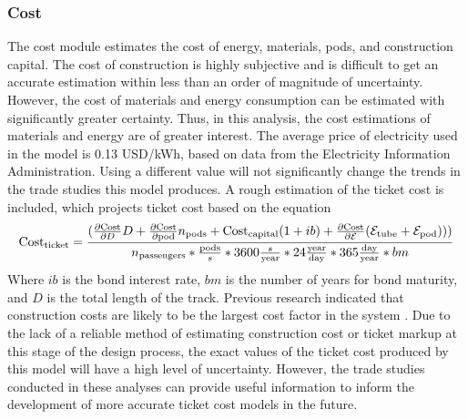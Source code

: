 \subsubsection{Cost}
	The cost module estimates the cost of energy, materials, pods, and
	construction capital. The cost of construction is highly subjective and is
	difficult to get an accurate estimation within less than an order of
	magnitude of uncertainty. However, the cost of materials and energy
	consumption can be estimated with significantly greater certainty.
	Thus, in this analysis, the cost estimations of materials and energy are of greater interest.
	The average price of electricity used in the model is 0.13 USD/kWh, based on
	data from the Electricity Information Administration\cite{EIA}.
	Using a different value will not significantly change the trends in the trade studies this model produces.
	A rough estimation of the ticket cost is included, which projects ticket cost based on the equation
	\begin{equation}
		\label{eq:ticket_cost}
    \text{Cost}_\text{ticket} = \frac{ (\frac{\partial \text{Cost}}{\partial D}D+\frac{\partial \text{Cost} }{\partial \text{pod}}n_{\text{pods}}+\text{Cost}_\text{capital} ( 1+ib ) + \frac{\partial \text{Cost}}{\partial \mathcal{E}} (\mathcal{E}_\text{tube} + \mathcal{E}_\text{pod}  ))  )}{n_\text{passengers}*\frac{\text{pods}}{s}*3600\frac{s}{\text{\text{year}}}*24\frac{\text{\text{year}}}{\text{day}}*365\frac{\text{day}}{\text{year}}*bm}
	\end{equation}
	Where $ib$ is the bond interest rate, $bm$ is the number of years for bond
	maturity, and $D$ is the total length of the track. Previous research
	indicated that construction costs are likely to be the largest cost factor
	in the system \cite{Musk}. Due to the lack of a reliable method of
	estimating construction cost or ticket markup at this stage of the design process,
	the exact values of the ticket cost produced by this model will have a high level of uncertainty.
	However, the trade studies conducted in these analyses can provide useful
	information to inform the development of more accurate ticket cost models in the future.
